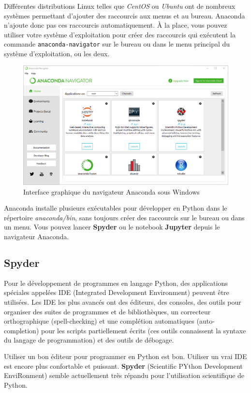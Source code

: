 \documentclass[%
oneside,                 %
final,                   %
10pt,french]{article}
\begin{document}
Différentes distributions Linux telles que \emph{CentOS} ou \emph{Ubuntu} ont de nombreux systèmes permettant d’ajouter des raccourcis aux menus et au bureau. Anaconda n’ajoute donc pas ces raccourcis automatiquement. À la place, vous pouvez utiliser votre système d'exploitation pour créer des raccourcis qui exécutent la commande \texttt{anaconda-navigator} sur le bureau ou dans le menu principal du système d'exploitation, ou les deux.


\begin{figure}[!ht]  %
  \centerline{\includegraphics[width=0.7\linewidth]{imgs/AnacondaNavigator.png}}
  \caption{
  Interface graphique du navigateur Anaconda sous Windows
  }
\end{figure}


Anaconda installe plusieurs exécutables pour développer en Python dans le répertoire \emph{anaconda/bin}, sans toujours créer des raccourcis sur le bureau ou dans un menu. Vous pouvez lancer \textbf{Spyder} ou le notebook \textbf{Jupyter} depuis le navigateur Anaconda.

\subsection{Spyder}
Pour le développement de programmes en langage Python, des applications spéciales appelées IDE (Integrated Development Environment) peuvent être utilisées. Les IDE les plus avancés ont des éditeurs, des consoles, des outils pour organiser des suites de programmes et de bibliothèques, un correcteur orthographique (spell-checking) et une complétion automatiques (auto-completion) pour les scripts partiellement écrits (ces outils connaissent la syntaxe du langage de programmation) et des outils de débogage.

Utiliser un bon éditeur pour programmer en Python est bon. Utiliser un vrai IDE est encore plus confortable et puissant. \textbf{Spyder} (Scientific PYthon Development EnviRonment) semble actuellement très répandu pour l’utilisation scientifique de Python.
\end{document}
